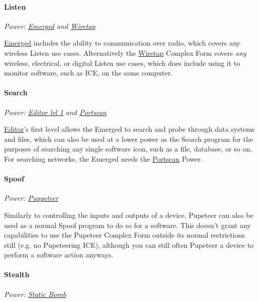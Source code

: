 \begin{multicols*}{3}
	\paragraph{Listen}
	\begin{center}
		\textit{Power: \hyperref[emerged]{Emerged} and \hyperref[wiretap]{Wiretap}}
	\end{center}

	\hyperref[emerged]{Emerged} includes the ability to communication over radio, which covers any wireless Listen use cases. Alternatively the \hyperref[wiretap]{Wiretap} Complex Form covers \textit{any} wireless, electrical, or digital Listen use cases, which does include using it to monitor software, such as ICE, on the same computer.
	
	\paragraph{Search}
	\begin{center}
		\textit{Power: \hyperref[editor]{Editor lvl 1} and \hyperref[portscan]{Portscan}}
	\end{center}

	\hyperref[editor]{Editor}'s first level allows the Emerged to search and probe through data systems and files, which can also be used at a lower power as the Search program for the purposes of searching any single software icon, such as a file, database, or so on. For searching networks, the Emerged needs the \hyperref[portscan]{Portscan} Power.
	
	\paragraph{Spoof}
	\begin{center}
		\textit{Power: \hyperref[puppeteer]{Puppeteer}}
	\end{center}

	Similarly to controlling the inputs and outputs of a device, Pupeteer can also be used as a normal Spoof program to do so for a software. This doesn't grant any capabilities to use the Pupeteer Complex Form outside its normal restrictions still (e.g. no Pupeteering ICE), although you can still often Pupeteer a device to perform a software action anyways.

	\paragraph{Stealth}
	\begin{center}
	\textit{Power: \hyperref[static_bomb]{Static Bomb}}
	\end{center}
	

\end{multicols*}
